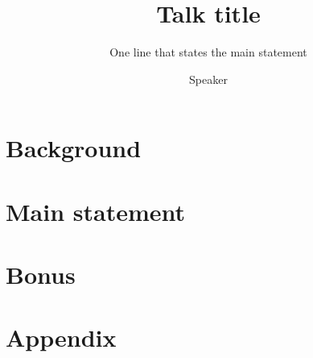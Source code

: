 \documentclass[aspectratio=169,11pt]{beamer}
\title{Talk title}
\subtitle{One line that states the main statement}
\author{Speaker}
\date{}
\begin{document}
\begin{frame}[plain]\titlepage\end{frame}
\section{Background}

\section{Main statement}


\ifBonus
\section{Bonus}

\fi
\ifBackup
\appendix
\section{Appendix}

\fi

\end{document}
